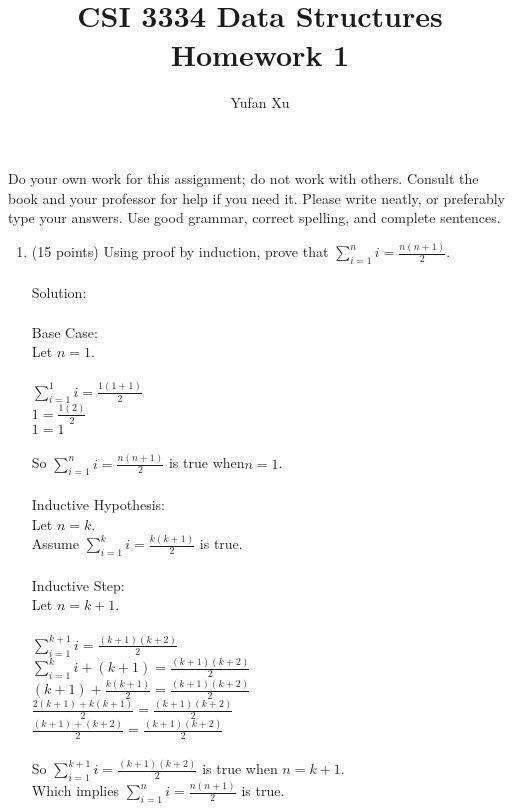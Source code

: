 \documentclass[12pt]{article}
\title{CSI 3334 Data Structures\\Homework 1}
\author{Yufan Xu}
\begin{document}
\thispagestyle{empty}

\maketitle 



Do your own work for this assignment; do not work with others. Consult the book
and your professor for help if you need it. Please write neatly, or preferably
type your answers. Use good grammar, correct spelling, and complete sentences.


\begin{enumerate}

\item  (15 points) Using proof by induction, prove that $\sum_{i=1}^{n} i = \frac{ n ( n + 1 ) }{2}$.
\\\\Solution:
\\\\Base Case: 
\\Let $n = 1$.
\\\\$\sum_{i=1}^{1} i = \frac{1(1+1)}{2}$
\\$1 = \frac{1(2)}{2}$
\\$1 = 1$
\\\\So  $\sum_{i=1}^{n} i = \frac{ n ( n + 1 ) }{2}$ is true when$ n = 1$.
\\\\Inductive Hypothesis: 
\\Let $n = k$.
\\Assume $\sum_{i=1}^{k} i = \frac{k(k+1)}{2}$ is true.
\\\\Inductive Step: 
\\Let $n = k + 1$.
\\\\ $\sum_{i=1}^{k+1} i = \frac{(k+1)(k+2)}{2}$
\\ $\sum_{i=1}^{k} i +(k+1) = \frac{(k+1)(k+2)}{2}$
\\$(k+1)+\frac{k(k+1)}{2} = \frac{(k+1)(k+2)}{2}$
\\$\frac{2(k+1)+k(k+1)}{2} = \frac{(k+1)(k+2)}{2}$
\\$\frac{(k+1)+(k+2)}{2} = \frac{(k+1)(k+2)}{2}$
\\\\So $\sum_{i=1}^{k+1} i = \frac{(k+1)(k+2)}{2}$ is true when $n=k+1$.
\\Which implies $\sum_{i=1}^{n} i = \frac{ n ( n + 1 ) }{2}$ is true.
\\\\


\end{enumerate}
\end{document}
